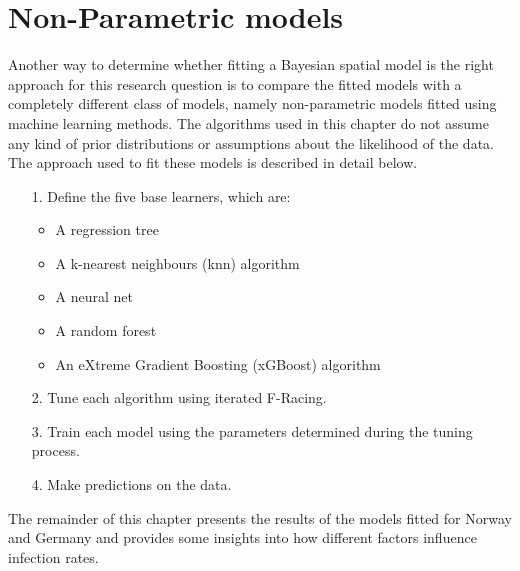 \section{Non-Parametric models}\label{sec:predictive}
Another way to determine whether fitting a Bayesian spatial model is the right approach for this research question is to compare the fitted models with a completely different class of models, namely non-parametric models fitted using machine learning methods. The algorithms used in this chapter do not assume any kind of prior distributions or assumptions about the likelihood of the data.\\
The approach used to fit these models is described in detail below.
\begin{itemize}
    \item[1.] Define the five base learners, which are:
    \begin{itemize}
        \item A regression tree
        \item A k-nearest neighbours (knn) algorithm
        \item A neural net
        \item A random forest
        \item An eXtreme Gradient Boosting (xGBoost) algorithm
    \end{itemize}
    \item[2.] Tune each algorithm using iterated F-Racing.
    \item[3.] Train each model using the parameters determined during the tuning process.
    \item[4.] Make predictions on the data.
\end{itemize}
The remainder of this chapter presents the results of the models fitted for Norway and Germany and provides some insights into how different factors influence infection rates.
